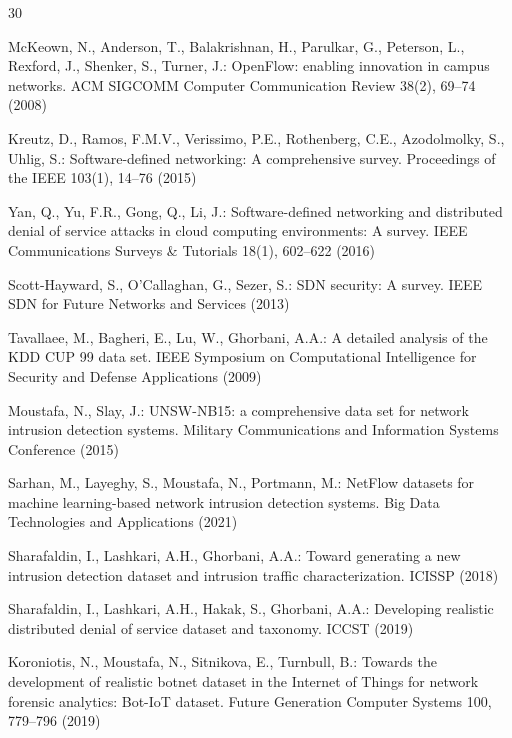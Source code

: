 \documentclass[runningheads]{llncs}
\begin{document}
\begin{thebibliography}{30}

McKeown, N., Anderson, T., Balakrishnan, H., Parulkar, G., Peterson, L.,
Rexford, J., Shenker, S., Turner, J.: OpenFlow: enabling innovation in campus
networks. ACM SIGCOMM Computer Communication Review 38(2), 69--74 (2008)

Kreutz, D., Ramos, F.M.V., Verissimo, P.E., Rothenberg, C.E., Azodolmolky, S.,
Uhlig, S.: Software-defined networking: A comprehensive survey. Proceedings of
the IEEE 103(1), 14--76 (2015)

Yan, Q., Yu, F.R., Gong, Q., Li, J.: Software-defined networking and
distributed denial of service attacks in cloud computing environments: A survey.
IEEE Communications Surveys \& Tutorials 18(1), 602--622 (2016)

Scott-Hayward, S., O'Callaghan, G., Sezer, S.: SDN security: A survey. IEEE
SDN for Future Networks and Services (2013)

Tavallaee, M., Bagheri, E., Lu, W., Ghorbani, A.A.: A detailed analysis of the
KDD CUP 99 data set. IEEE Symposium on Computational Intelligence for Security
and Defense Applications (2009)

Moustafa, N., Slay, J.: UNSW-NB15: a comprehensive data set for network
intrusion detection systems. Military Communications and Information Systems
Conference (2015)

Sarhan, M., Layeghy, S., Moustafa, N., Portmann, M.: NetFlow datasets for
machine learning-based network intrusion detection systems. Big Data
Technologies and Applications (2021)

Sharafaldin, I., Lashkari, A.H., Ghorbani, A.A.: Toward generating a new
intrusion detection dataset and intrusion traffic characterization. ICISSP
(2018)

Sharafaldin, I., Lashkari, A.H., Hakak, S., Ghorbani, A.A.: Developing
realistic distributed denial of service dataset and taxonomy. ICCST (2019)

Koroniotis, N., Moustafa, N., Sitnikova, E., Turnbull, B.: Towards the
development of realistic botnet dataset in the Internet of Things for network
forensic analytics: Bot-IoT dataset. Future Generation Computer Systems 100,
779--796 (2019)


\end{thebibliography}
\end{document}
